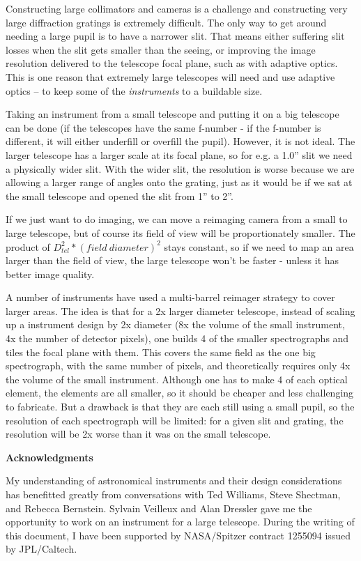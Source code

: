 \documentclass[12pt]{article}
\begin{document}
Constructing
large collimators and cameras is a challenge and constructing
very large diffraction gratings is extremely difficult.
The only way to get around needing a large pupil is to have
a narrower slit.  That means either suffering slit losses when the
slit gets smaller than the seeing, or improving
the image resolution delivered to the telescope focal plane, such as
with adaptive optics.  This is one reason that extremely large
telescopes will need and use adaptive optics -- to keep some of 
the {\it instruments} to a buildable size.

Taking an instrument from a small telescope and putting it on
a big telescope can be done (if the telescopes have the same 
f-number - if the f-number is different, it will either underfill
or overfill the pupil).  However, it is not ideal.  The larger
telescope has a larger scale at its focal plane, so for e.g.
a 1.0'' slit we need a physically wider slit.  With the wider
slit, the resolution is worse because we are allowing a 
larger range of angles onto the grating, just as it would 
be if we sat at the small telescope and opened the slit from 1'' to 2''.

If we just want to do imaging, we can move a reimaging camera
from a small to large telescope, but of course its field of
view will be proportionately smaller.  The product of 
$D_{tel}^2 * (field\ diameter)^2$ stays constant, so if we need to
map an area larger than the field of view, the large telescope won't be
faster - unless it has better image quality.

A number of instruments have used a multi-barrel reimager
strategy to cover larger areas.  The idea is that for a 2x larger
diameter
telescope, instead of scaling up a instrument design by 2x diameter
(8x the volume of the small instrument, 4x the number of detector
pixels), one builds 4 of the 
smaller spectrographs and tiles the focal plane with them.  This 
covers the same field as the one big spectrograph, with the same
number of pixels, and theoretically
requires only 4x the volume of the small instrument.  Although one 
has to make 4 of each optical element, the elements are all smaller, 
so it should be cheaper and less challenging to fabricate.  But a 
drawback is that they are each still
using a small pupil, so the resolution of each spectrograph 
will be limited: for a given slit and grating, the resolution will
be 2x worse than it was on the small telescope.



\vspace{1 in}

\bigskip


{\bf Acknowledgments}

My understanding of astronomical instruments and their design
considerations has benefitted greatly from conversations with
Ted Williams, Steve Shectman, and Rebecca Bernstein.
Sylvain Veilleux and Alan Dressler gave me the opportunity to
work on an instrument for a large telescope.  During the
writing of this document, I have been supported by 
NASA/Spitzer contract 1255094 issued by JPL/Caltech.
\end{document}
